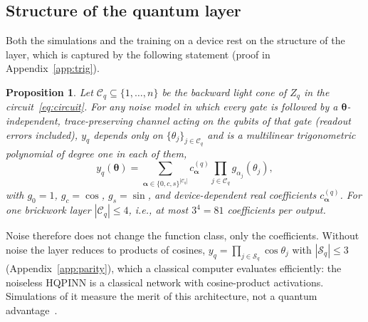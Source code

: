 \documentclass[floatfix,aps,pra,twocolumn,superscriptaddress,10pt,nofootinbib]{revtex4-2}
\newtheorem{proposition}{Proposition}
\begin{document}
\subsection{Structure of the quantum layer}\label{sec:layer}
Both the simulations and the training on a device rest on the structure of the layer, which is captured by the following statement (proof in Appendix~\ref{app:trig}).
\begin{proposition}\label{prop:trig}
Let $\mathcal C_q\subseteq\{1,\dots,n\}$ be the backward light cone of $Z_q$ in the circuit~\eqref{eq:circuit}. For any noise model in which every gate is followed by a $\bm\theta$-independent, trace-preserving channel acting on the qubits of that gate (readout errors included), $y_q$ depends only on $\{\theta_j\}_{j\in\mathcal C_q}$ and is a multilinear trigonometric polynomial of degree one in each of them,
\begin{equation}
  y_q(\bm\theta)=\sum_{\bm\alpha\in\{0,c,s\}^{|\mathcal C_q|}}c^{(q)}_{\bm\alpha}\prod_{j\in\mathcal C_q}g_{\alpha_j}(\theta_j),
  \label{eq:trigpoly}
\end{equation}
with $g_0=1$, $g_c=\cos$, $g_s=\sin$, and device-dependent real coefficients $c^{(q)}_{\bm\alpha}$. For one brickwork layer $|\mathcal C_q|\le4$, i.e., at most $3^4=81$ coefficients per output.
\end{proposition}
Noise therefore does not change the function class, only the coefficients. Without noise the layer reduces to products of cosines, $y_q=\prod_{j\in\mathcal S_q}\cos\theta_j$ with $|\mathcal S_q|\le3$ (Appendix~\ref{app:parity}), which a classical computer evaluates efficiently: the noiseless HQPINN is a classical network with cosine-product activations. Simulations of it measure the merit of this architecture, not a quantum advantage~\cite{schreiber2023classical}.
\end{document}
